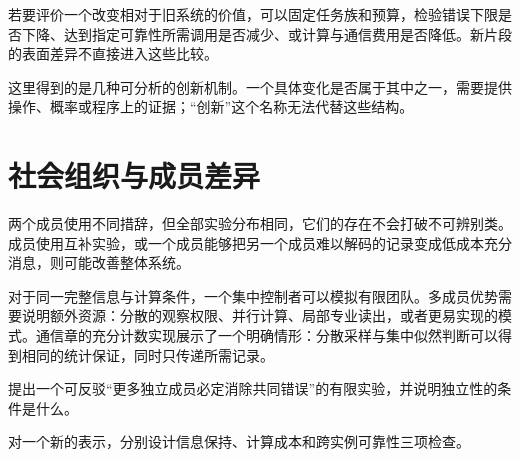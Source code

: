 若要评价一个改变相对于旧系统的价值，可以固定任务族和预算，检验错误下限是否下降、达到指定可靠性所需调用是否减少、或计算与通信费用是否降低。新片段的表面差异不直接进入这些比较。

这里得到的是几种可分析的创新机制。一个具体变化是否属于其中之一，需要提供操作、概率或程序上的证据；“创新”这个名称无法代替这些结构。

\section{社会组织与成员差异}
两个成员使用不同措辞，但全部实验分布相同，它们的存在不会打破不可辨别类。成员使用互补实验，或一个成员能够把另一个成员难以解码的记录变成低成本充分消息，则可能改善整体系统。

对于同一完整信息与计算条件，一个集中控制者可以模拟有限团队。多成员优势需要说明额外资源：分散的观察权限、并行计算、局部专业读出，或者更易实现的模式。通信章的充分计数实现展示了一个明确情形：分散采样与集中似然判断可以得到相同的统计保证，同时只传递所需记录。

\begin{exercise}提出一个可反驳“更多独立成员必定消除共同错误”的有限实验，并说明独立性的条件是什么。\end{exercise}
\begin{exercise}对一个新的表示，分别设计信息保持、计算成本和跨实例可靠性三项检查。\end{exercise}
